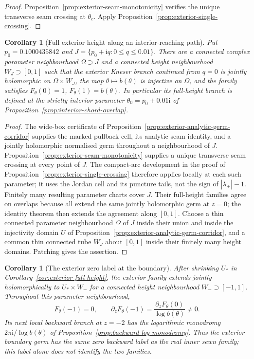 \documentclass[11pt]{amsart}
\newtheorem{corollary}[theorem]{Corollary}
\theoremstyle{definition}
\newcommand{\ii}{\mathrm{i}}
\begin{document}
\begin{proof}
Proposition~\ref{prop:exterior-seam-monotonicity} verifies the
unique transverse seam crossing at $\theta_c$.
Apply Proposition~\ref{prop:exterior-single-crossing}.
\end{proof}

\begin{corollary}[Full exterior height along an interior-reaching path]
\label{cor:exterior-wide-full-height}
Put $p_0=0.1000435842$ and
$J=\{p_0+\ii q:0\le q\le0.01\}$.  There are a connected
complex parameter neighbourhood $\Omega\supset J$ and a connected
height neighbourhood $W_J\supset[0,1]$ such that the exterior
Kneser branch continued from $q=0$ is jointly holomorphic on
$\Omega\times W_J$, the map $\theta\mapsto b(\theta)$ is
injective on $\Omega$, and the family satisfies
$F_\theta(0)=1$, $F_\theta(1)=b(\theta)$.
In particular its full-height branch is defined at the strictly
interior parameter $\theta_0=p_0+0.01\ii$ of
Proposition~\ref{prop:interior-chord-overlap}.
\end{corollary}

\begin{proof}
The wide-box certificate of
Proposition~\ref{prop:exterior-analytic-germ-corridor} supplies
the marked pullback cell, its analytic seam identity, and a jointly
holomorphic normalised germ throughout a neighbourhood of $J$.
Proposition~\ref{prop:exterior-seam-monotonicity} supplies a unique
transverse seam crossing at every point of $J$.  The compact-arc
development in the proof of
Proposition~\ref{prop:exterior-single-crossing} therefore applies
locally at each such parameter; it uses the Jordan cell and its
puncture tails, not the sign of $|\lambda_+|-1$.
Finitely many resulting parameter charts cover $J$.  Their
full-height families agree on overlaps because all extend the
same jointly holomorphic germ at $z=0$; the identity theorem
then extends the agreement along $[0,1]$.  Choose a thin connected
parameter neighbourhood $\Omega$ of $J$ inside their union and
inside the injectivity domain $U$ of
Proposition~\ref{prop:exterior-analytic-germ-corridor}, and
a common thin connected tube $W_J$ about $[0,1]$ inside their
finitely many height domains.  Patching gives the assertion.
\end{proof}

\begin{corollary}[The exterior zero label at the boundary]
\label{cor:exterior-boundary-zero}
After shrinking $U_*$ in Corollary~\ref{cor:exterior-full-height},
the exterior family extends jointly holomorphically to
$U_*\times W_-$ for a connected height neighbourhood
$W_-\supset[-1,1]$.  Throughout this parameter neighbourhood,
\[
 F_\theta(-1)=0,\qquad
 \partial_zF_\theta(-1)=
   \frac{\partial_zF_\theta(0)}{\log b(\theta)}\ne0.
\]
Its next local backward branch at $z=-2$ has the logarithmic
monodromy $2\pi\ii/\log b(\theta)$ of
Proposition~\ref{prop:backward-log-monodromy}.
Thus the exterior boundary germ has the same zero backward label
as the real inner sewn family; this label alone does not identify
the two families.
\end{corollary}
\end{document}
